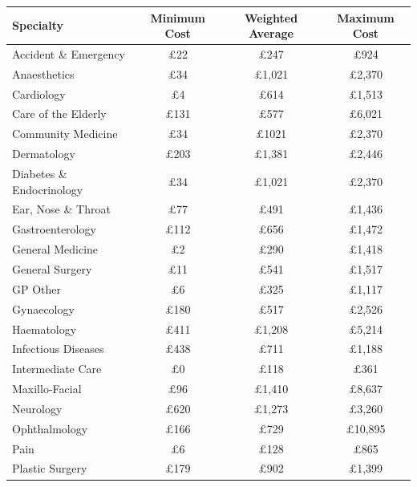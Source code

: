 \documentclass[../thesis.tex]{subfiles}
\begin{document}
\begin{table}[h!]
    \centering
    \begin{tabular}{lccc}\toprule
        \textbf{Specialty} & \textbf{Minimum Cost} & \textbf{Weighted Average} & \textbf{Maximum Cost} \\\midrule
        Accident \& Emergency & $\pounds$22 &$\pounds$247 &$\pounds$924 \\
        Anaesthetics & $\pounds$34 & $\pounds$1,021 & $\pounds$2,370\\
        Cardiology & $\pounds$4 & $\pounds$614 & $\pounds$1,513 \\
        Care of the Elderly & $\pounds$131 & $\pounds$577 & $\pounds$6,021 \\
        Community Medicine & $\pounds$34 & $\pounds$1021 & $\pounds$2,370\\
        Dermatology & $\pounds$203 & $\pounds$1,381 &$\pounds$2,446 \\
        Diabetes \& Endocrinology & $\pounds$34 & $\pounds$1,021 & $\pounds$2,370\\
        Ear, Nose \& Throat & $\pounds$77 & $\pounds$491 & $\pounds$1,436 \\
        Gastroenterology & $\pounds$112 & $\pounds$656 & $\pounds$1,472 \\
        General Medicine & $\pounds$2 & $\pounds$290 & $\pounds$1,418\\
        General Surgery & $\pounds$11 & $\pounds$541 & $\pounds$1,517\\
        GP Other & $\pounds$6& $\pounds$325 & $\pounds$1,117\\
        Gynaecology & $\pounds$180 & $\pounds$517 & $\pounds$2,526 \\
        Haematology & $\pounds$411 & $\pounds$1,208 & $\pounds$5,214 \\
        Infectious Diseases & $\pounds$438 &$\pounds$711 & $\pounds$1,188 \\
        Intermediate Care & $\pounds$0 & $\pounds$118 & $\pounds$361 \\
        Maxillo-Facial & $\pounds$96 & $\pounds$1,410 & $\pounds$8,637 \\
        Neurology & $\pounds$620 & $\pounds$1,273 & $\pounds$3,260 \\
        Ophthalmology & $\pounds$166 & $\pounds$729 & $\pounds$10,895 \\
        Pain &$\pounds$6 & $\pounds$128 & $\pounds$865 \\
        Plastic Surgery & $\pounds$179 & $\pounds$902 & $\pounds$1,399 \\

\end{tabular}
\end{table}
\end{document}
